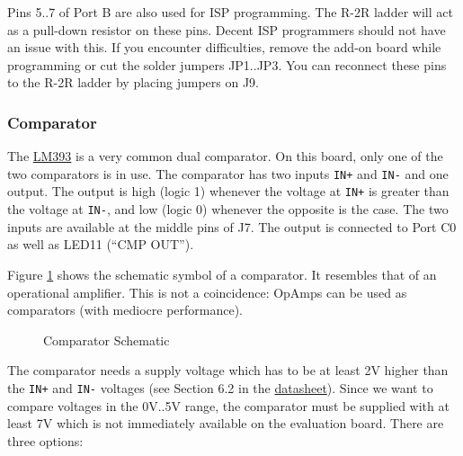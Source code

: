 \documentclass{article}
\newenvironment{note}{\begin{tcolorbox}[colback=blue!5!white,colframe=blue!75!black,title=\textbf{Note}]}{\end{tcolorbox}}
\begin{document}
\begin{note}
Pins 5..7 of Port B are also used for ISP programming. The R-2R ladder will act as a pull-down resistor on these pins. Decent ISP programmers should not have an issue with this. If you encounter difficulties, remove the add-on board while programming or cut the solder jumpers JP1..JP3. You can reconnect these pins to the R-2R ladder by placing jumpers on J9. 
\end{note}

\subsubsection{Comparator}\label{sec:cmp}
The \href{https://www.ti.com/lit/ds/symlink/lm393.pdf}{LM393} is a very common dual comparator. On this board, only one of the two comparators is in use. The comparator has two inputs \texttt{IN+} and \texttt{IN-} and one output. The output is high (logic 1) whenever the voltage at \texttt{IN+} is greater than the voltage at \texttt{IN-}, and low (logic 0) whenever the opposite is the case. The two inputs are available at the middle pins of J7. The output is connected to Port C0 as well as LED11 (``CMP OUT''). 

Figure \ref{fig:cmpSchematic} shows the schematic symbol of a comparator. It resembles that of an operational amplifier. This is not a coincidence: OpAmps can be used as comparators (with mediocre performance). 

\begin{figure}[htb]
\centering
{}
\caption{Comparator Schematic}
\label{fig:cmpSchematic}
\end{figure}

The comparator needs a supply voltage which has to be at least 2V higher than the \texttt{IN+} and \texttt{IN-} voltages (see Section 6.2 in the \href{https://www.ti.com/lit/ds/symlink/lm393.pdf}{datasheet}). Since we want to compare voltages in the 0V..5V range, the comparator must be supplied with at least 7V which is not immediately available on the evaluation board. There are three options:
\end{document}
